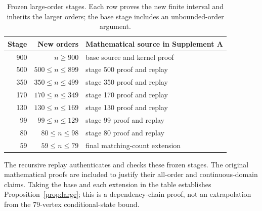 \begin{table}[ht]
\centering
\caption{Frozen large-order stages. Each row proves the new finite interval and inherits the larger orders; the base stage includes an unbounded-order argument.}
\begin{tabular}{rrl}
\toprule Stage & New orders & Mathematical source in Supplement A\\\midrule
900 & $n\ge900$ & base source and kernel proof\\
500 & $500\le n\le899$ & stage 500 proof and replay\\
350 & $350\le n\le499$ & stage 350 proof and replay\\
170 & $170\le n\le349$ & stage 170 proof and replay\\
130 & $130\le n\le169$ & stage 130 proof and replay\\
99 & $99\le n\le129$ & stage 99 proof and replay\\
80 & $80\le n\le98$ & stage 80 proof and replay\\
59 & $59\le n\le79$ & final matching-count extension\\\bottomrule
\end{tabular}
\end{table}
The recursive replay authenticates and checks these frozen stages. The original mathematical proofs are included to justify their all-order and continuous-domain claims. Taking the base and each extension in the table establishes Proposition~\ref{prop:large}; this is a dependency-chain proof, not an extrapolation from the 79-vertex conditional-state bound.
